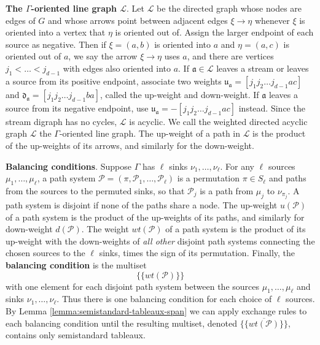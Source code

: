 \documentclass[11pt,letterpaper]{amsart}
\theoremstyle{definition}
\begin{document}
\textbf{The $\Gamma$-oriented line graph $\mathcal{L}$}. Let $\mathcal{L}$ be the directed graph whose nodes are edges of $G$ and whose arrows point between adjacent edges $\xi \to \eta$ whenever $\xi$ is oriented into a vertex that $\eta$ is oriented out of. Assign the larger endpoint of each source as negative.  Then if $\xi = (a,b)$ is oriented into $a$ and $\eta = (a,c)$ is oriented out of $a$, we say the arrow $\xi \to \eta$ uses $a$, and there are vertices $j_1 <\dots <j_{d-1}$ with edges also oriented into $a$. 
If $\mathfrak{a} \in \mathcal{L}$ leaves a stream or leaves a source from its positive endpoint, associate two weights $\mathfrak{u}_\mathfrak{a} = [j_1 j_2 \dots j_{d-1}ac]$ and $\mathfrak{d}_\mathfrak{a} = [j_1 j_2 \dots j_{d-1} b a]$, called the up-weight and down-weight. If $\mathfrak{a}$ leaves a source from its negative endpoint, use $\mathfrak{u}_\mathfrak{a} = -[j_1 j_2 \dots j_{d-1}ac]$ instead.
Since the stream digraph has no cycles, $\mathcal{L}$ is acyclic. We call the weighted directed acyclic graph $\mathcal{L}$ the $\Gamma$-oriented line graph. The up-weight of a path in $\mathcal{L}$ is the product of the up-weights of its arrows, and similarly for the down-weight.

\textbf{Balancing conditions}. Suppose $\Gamma$ has $\ell$ sinks $\nu_1,\dots, \nu_\ell$. For any $\ell$ sources $\mu_1,\dots,\mu_\ell$, a path system $\mathcal{P}=(\pi,\mathcal{P}_1,\dots,\mathcal{P}_\ell)$ is a permutation $\pi \in S_\ell$ and paths from the sources to the permuted sinks, so that $\mathcal{P}_j$ is a path from $\mu_j$ to $\nu_{\pi_j}$. A path system is disjoint if none of the paths share a node.
The up-weight $u(\mathcal{P})$ of a path system is the product of the up-weights of its paths, and similarly for down-weight $d(\mathcal{P})$. 
The weight $wt(\mathcal{P})$ of a path system is the product of its up-weight with the down-weights of \textit{all other} disjoint path systems connecting the chosen sources to the $\ell$ sinks, times the sign of its permutation. Finally, the \textbf{balancing condition} is the multiset
\begin{equation}\label{eqn:LGV-balancing-condition}
    \{\{ wt(\mathcal{P}) \}\}
\end{equation}
with one element for each disjoint path system between the sources $\mu_1,\dots,\mu_\ell$ and sinks $\nu_1,\dots, \nu_\ell$. Thus there is one balancing condition for each choice of $\ell$ sources. By Lemma \ref{lemma:semistandard-tableaux-span} we can apply exchange rules to each balancing condition until the resulting multiset, denoted $\overline{\{\{ wt(\mathcal{P}) \}\}}$, contains only semistandard tableaux.
\end{document}
